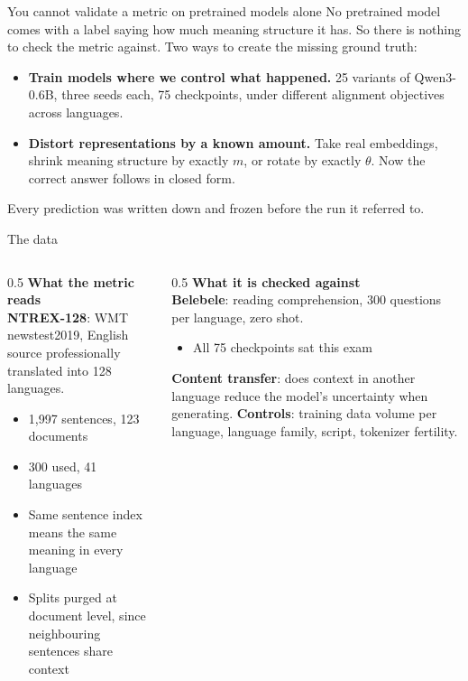 \documentclass[aspectratio=169,11pt]{beamer}
\newcommand{\Hi}[1]{{\color{acc}\textbf{#1}}}
\begin{document}
\begin{frame}{You cannot validate a metric on pretrained models alone}
\large
No pretrained model comes with a label saying how much meaning
structure it has. So there is nothing to check the metric against.
\vspace{14pt}
\normalsize
Two ways to create the missing ground truth:
\begin{itemize}\setlength\itemsep{8pt}
\item \Hi{Train models where we control what happened.} 25 variants of
Qwen3-0.6B, three seeds each, 75 checkpoints, under different alignment
objectives across languages.
\item \Hi{Distort representations by a known amount.} Take real
embeddings, shrink meaning structure by exactly $m$, or rotate by
exactly $\theta$. Now the correct answer follows in closed form.
\end{itemize}
\vspace{10pt}
{\color{mut}Every prediction was written down and frozen before the run
it referred to.}
\end{frame}

\begin{frame}{The data}
\begin{columns}[T]
\begin{column}{0.5\textwidth}
\Hi{What the metric reads}\\[4pt]
\textbf{NTREX-128}: WMT newstest2019, English source professionally
translated into 128 languages.
\begin{itemize}
\item 1{,}997 sentences, 123 documents
\item 300 used, 41 languages
\item Same sentence index means the same meaning in every language
\item Splits purged at document level, since neighbouring sentences
share context
\end{itemize}
\end{column}
\begin{column}{0.5\textwidth}
\Hi{What it is checked against}\\[4pt]
\textbf{Belebele}: reading comprehension, 300 questions per language,
zero shot.
\begin{itemize}
\item All 75 checkpoints sat this exam
\end{itemize}
\vspace{4pt}
\textbf{Content transfer}: does context in another language reduce the
model's uncertainty when generating.
\vspace{6pt}
\textbf{Controls}: training data volume per language, language family,
script, tokenizer fertility.
\end{column}
\end{columns}
\end{frame}
\end{document}
